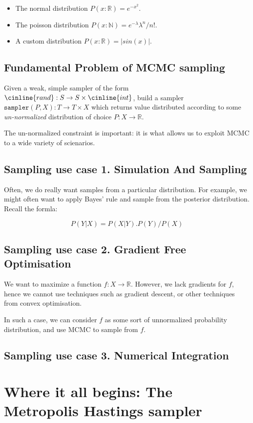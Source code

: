 \documentclass[titlepage]{article}
\newcommand{\N}{\mathbb{N}}
\newcommand{\R}{\mathbb{R}}
\begin{document}
\begin{itemize}
    \item The normal distribution $P(x: \R) = e^{-x^2}$.
    \item The poisson distribution $P(x: \N) = e^{-\lambda} \lambda^n/n!$.
    \item A custom distribution $P(x: \R) = |sin(x)|$.
\end{itemize}

\subsection{Fundamental Problem of MCMC sampling}
Given a weak, simple sampler of the form $\cinline{rand} : S \rightarrow S \times \cinline{int}$,
build a sampler $\texttt{sampler}(P, X): T \rightarrow T \times X$ which returns
value distributed according to some \emph{un-normalized}
distribution of choice $P: X \rightarrow \mathbb R$.

The un-normalized constraint is important: it is what allows
us to exploit MCMC to a wide variety of scienarios.

\subsection{Sampling use case 1. Simulation And Sampling}
Often, we do really want samples from a particular distribution. For example,
we might often want to apply Bayes' rule and sample from the posterior
distribution. Recall the formla:

$$
P(Y|X) = P(X|Y).P(Y)/P(X)
$$


\subsection{Sampling use case 2. Gradient Free Optimisation}
We  want to maximize a function $f: X \rightarrow \R$. However, we lack
gradients for $f$, hence we cannot use techniques such as gradient
descent, or other techniques from convex optimisation.

In such a case, we can consider $f$ as some sort of unnormalized
probability distribution, and use MCMC to sample from $f$.


\subsection{Sampling use case 3. Numerical Integration}

\section{Where it all begins: The Metropolis Hastings sampler}
\end{document}

